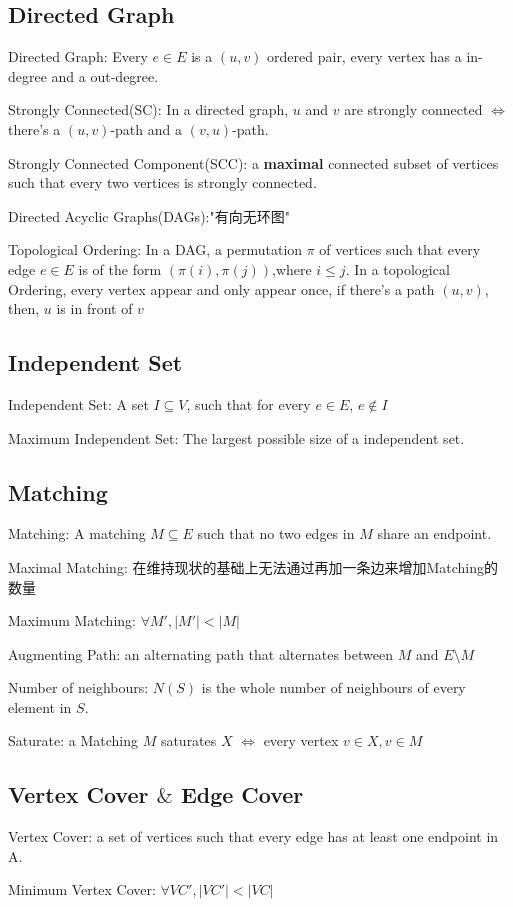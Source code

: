 \documentclass[12pt,a4paper]{ctexrep}
\begin{document}
\subsection{Directed Graph}
Directed Graph: Every $e \in E$ is a $(u,v)$ ordered pair, every vertex has a in-degree and a out-degree.

Strongly Connected(SC): In a directed graph, $u$ and $v$ are strongly connected $\iff$ there's a $(u,v)$-path and a $(v,u)$-path.

Strongly Connected Component(SCC): a \textbf{maximal} connected subset of vertices such that every two vertices is strongly connected.

Directed Acyclic Graphs(DAGs):"有向无环图"

Topological Ordering: In a DAG, a permutation $\pi$ of vertices such that every edge $e\in E$ is of the form $(\pi(i),\pi(j))$,where $i\leq j$. In a topological Ordering, every vertex appear and only appear once, if there's a path $(u,v)$, then, $u$ is in front of $v$
\subsection{Independent Set}
Independent Set: A set $I\subseteq V$, such that for every $e \in E$, $e\notin I$

Maximum Independent Set: The largest possible size of a independent set.
\subsection{Matching}
Matching: A matching $M\subseteq E$ such that no two edges in $M$ share an endpoint.

Maximal Matching: 在维持现状的基础上无法通过再加一条边来增加Matching的数量

Maximum Matching: $\forall M', |M'|<|M|$

Augmenting Path: an alternating path that alternates between $M$ and $E\setminus M$

Number of neighbours: $N(S)$ is the whole number of neighbours of every element in $S$.

Saturate: a Matching $M$ saturates $X$ $\iff$ every vertex $v \in X, v \in M$
\subsection{Vertex Cover $\&$ Edge Cover}
Vertex Cover: a set of vertices such that every edge has at least one endpoint in A.

Minimum Vertex Cover: $\forall VC', |VC'|<|VC|$
\end{document}
